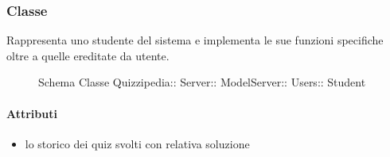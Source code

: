 \subsubsection{Classe }
Rappresenta uno studente del sistema e implementa le sue funzioni specifiche oltre a quelle ereditate da utente.
\begin{figure}[H]
\centering
\noindent{}
\caption[Schema Classe Student]{Schema Classe Quizzipedia:: Server:: ModelServer:: Users:: Student}
\end{figure}
\paragraph{Attributi}
\begin{itemize}
\item {}
\newline
lo storico dei quiz svolti con relativa soluzione
\end{itemize}
